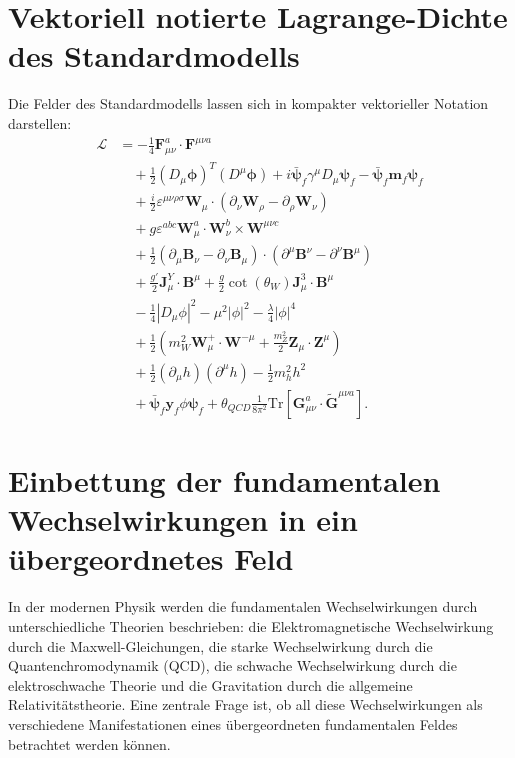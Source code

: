 \documentclass{article}
\begin{document}
	\section{Vektoriell notierte Lagrange-Dichte des Standardmodells}
	Die Felder des Standardmodells lassen sich in kompakter vektorieller Notation darstellen:
	\begin{align}
		\mathcal{L} &= -\frac{1}{4} \mathbf{F}_{\mu\nu}^a \cdot \mathbf{F}^{\mu\nu a} \\
		&\quad + \frac{1}{2} (D_\mu \boldsymbol{\phi})^T (D^\mu \boldsymbol{\phi}) + i \bar{\boldsymbol{\psi}}_f \gamma^\mu D_\mu \boldsymbol{\psi}_f - \bar{\boldsymbol{\psi}}_f \mathbf{m}_f \boldsymbol{\psi}_f \\
		&\quad + \frac{i}{2} \varepsilon^{\mu\nu\rho\sigma} \mathbf{W}_\mu \cdot (\partial_\nu \mathbf{W}_\rho - \partial_\rho \mathbf{W}_\nu) \\
		&\quad + g \varepsilon^{abc} \mathbf{W}_\mu^a \cdot \mathbf{W}_\nu^b \times \mathbf{W}^{\mu\nu c} \\
		&\quad + \frac{1}{2} (\partial_\mu \mathbf{B}_\nu - \partial_\nu \mathbf{B}_\mu) \cdot (\partial^\mu \mathbf{B}^\nu - \partial^\nu \mathbf{B}^\mu) \\
		&\quad + \frac{g'}{2} \mathbf{J}_\mu^Y \cdot \mathbf{B}^\mu + \frac{g}{2} \cot(\theta_W) \mathbf{J}_\mu^3 \cdot \mathbf{B}^\mu \\
		&\quad - \frac{1}{4} |D_\mu \phi|^2 - \mu^2 |\phi|^2 - \frac{\lambda}{4} |\phi|^4 \\
		&\quad + \frac{1}{2} (m_W^2 \mathbf{W}_\mu^+ \cdot \mathbf{W}^{-\mu} + \frac{m_Z^2}{2} \mathbf{Z}_\mu \cdot \mathbf{Z}^\mu) \\
		&\quad + \frac{1}{2} (\partial_\mu h)(\partial^\mu h) - \frac{1}{2} m_h^2 h^2 \\
		&\quad + \bar{\boldsymbol{\psi}}_f \mathbf{y}_f \phi \boldsymbol{\psi}_f + \theta_{QCD} \frac{1}{8\pi^2} \text{Tr}[\mathbf{G}_{\mu\nu}^a \cdot \tilde{\mathbf{G}}^{\mu\nu a}].
	\end{align}
	\section{Einbettung der fundamentalen Wechselwirkungen in ein übergeordnetes Feld}
	
	In der modernen Physik werden die fundamentalen Wechselwirkungen durch unterschiedliche Theorien beschrieben: die Elektromagnetische Wechselwirkung durch die Maxwell-Gleichungen, die starke Wechselwirkung durch die Quantenchromodynamik (QCD), die schwache Wechselwirkung durch die elektroschwache Theorie und die Gravitation durch die allgemeine Relativitätstheorie. Eine zentrale Frage ist, ob all diese Wechselwirkungen als verschiedene Manifestationen eines übergeordneten fundamentalen Feldes betrachtet werden können.
	
\end{document}
